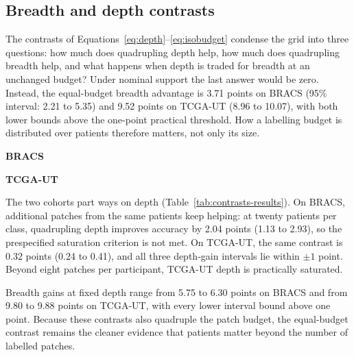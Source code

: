 \subsection{Breadth and depth contrasts}
The contrasts of Equations~\eqref{eq:depth}--\eqref{eq:isobudget} condense the grid into three questions: how much does quadrupling depth help, how much does quadrupling breadth help, and what happens when depth is traded for breadth at an unchanged budget? Under nominal support the last answer would be zero. Instead, the equal-budget breadth advantage is 3.71 points on BRACS (95\% interval: 2.21 to 5.35) and 9.52 points on TCGA-UT (8.96 to 10.07), with both lower bounds above the one-point practical threshold. How a labelling budget is distributed over patients therefore matters, not only its size.

\begin{table}[htbp]
\centering\small
\begin{minipage}[t]{0.48\textwidth}\centering
\textbf{BRACS}\par\smallskip

\end{minipage}\hfill
\begin{minipage}[t]{0.48\textwidth}\centering
\textbf{TCGA-UT}\par\smallskip

\end{minipage}
\caption{Quadrupling breadth helps far more than quadrupling depth in both cohorts, and trading depth for breadth at a fixed budget ($X$) still gains several points. Depth adds about two points on BRACS but less than half a point on TCGA-UT. Contrasts are in percentage points with paired 95\% intervals; $\Delta_m(G)$ quadruples depth from 8 to 32 at fixed breadth, and $\Delta_G(m)$ quadruples breadth from 5 to 20 at fixed depth.}
\label{tab:contrasts-results}
\end{table}

The two cohorts part ways on depth (Table~\ref{tab:contrasts-results}). On BRACS, additional patches from the same patients keep helping: at twenty patients per class, quadrupling depth improves accuracy by 2.04 points (1.13 to 2.93), so the prespecified saturation criterion is not met. On TCGA-UT, the same contrast is 0.32 points (0.24 to 0.41), and all three depth-gain intervals lie within $\pm1$ point. Beyond eight patches per participant, TCGA-UT depth is practically saturated.

Breadth gains at fixed depth range from 5.75 to 6.30 points on BRACS and from 9.80 to 9.88 points on TCGA-UT, with every lower interval bound above one point. Because these contrasts also quadruple the patch budget, the equal-budget contrast remains the cleaner evidence that patients matter beyond the number of labelled patches.


